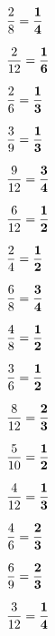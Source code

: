 \documentclass[a4j,fleqn]{jarticle}
\begin{document}
 \twocolumn[


 \vspace*{5ex} ]

 \begin{enumerate}
 
{\Large \item  $\displaystyle \frac{2}{8}={\bf \frac{1}{4}} $} \vfill
{\Large \item  $\displaystyle \frac{2}{12}={\bf \frac{1}{6}} $} \vfill
{\Large \item  $\displaystyle \frac{2}{6}={\bf \frac{1}{3}} $} \vfill
{\Large \item  $\displaystyle \frac{3}{9}={\bf \frac{1}{3}} $} \vfill
{\Large \item  $\displaystyle \frac{9}{12}={\bf \frac{3}{4}} $} \vfill
{\Large \item  $\displaystyle \frac{6}{12}={\bf \frac{1}{2}} $} \vfill
{\Large \item  $\displaystyle \frac{2}{4}={\bf \frac{1}{2}} $} \vfill
{\Large \item  $\displaystyle \frac{6}{8}={\bf \frac{3}{4}} $} \vfill

\newpage
 
{\Large \item  $\displaystyle \frac{4}{8}={\bf \frac{1}{2}} $} \vfill
{\Large \item  $\displaystyle \frac{3}{6}={\bf \frac{1}{2}} $} \vfill
{\Large \item  $\displaystyle \frac{8}{12}={\bf \frac{2}{3}} $} \vfill
{\Large \item  $\displaystyle \frac{5}{10}={\bf \frac{1}{2}} $} \vfill
{\Large \item  $\displaystyle \frac{4}{12}={\bf \frac{1}{3}} $} \vfill
{\Large \item  $\displaystyle \frac{4}{6}={\bf \frac{2}{3}} $} \vfill
{\Large \item  $\displaystyle \frac{6}{9}={\bf \frac{2}{3}} $} \vfill
{\Large \item  $\displaystyle \frac{3}{12}={\bf \frac{1}{4}} $} \vfill

  \end{enumerate}
  
\end{document}
